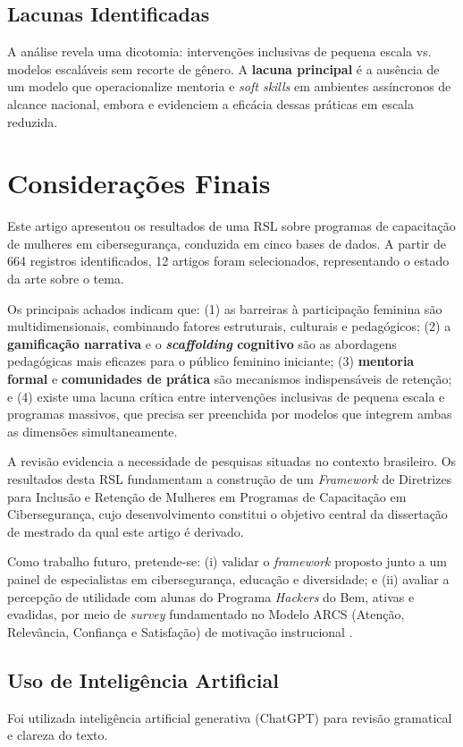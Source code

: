 \documentclass[12pt]{article}
\begin{document}
\subsection{Lacunas Identificadas}

A análise revela uma dicotomia: intervenções inclusivas de pequena escala vs. modelos escaláveis sem recorte de gênero. A \textbf{lacuna principal} é a ausência de um modelo que operacionalize mentoria e \textit{soft skills} em ambientes assíncronos de alcance nacional, embora \cite{Musuva2025} e \cite{Benson2025} evidenciem a eficácia dessas práticas em escala reduzida.


\section{Considerações Finais} \label{sec:conclusao}

Este artigo apresentou os resultados de uma RSL sobre programas de capacitação de
mulheres em cibersegurança, conduzida em cinco bases de dados. A partir de 664 registros identificados, 12 artigos foram selecionados, representando o estado da arte sobre o tema.

Os principais achados indicam que: (1) as barreiras à participação feminina são
multidimensionais, combinando fatores estruturais, culturais e pedagógicos; (2) a
\textbf{gamificação narrativa} e o \textbf{\textit{scaffolding} cognitivo} são as
abordagens pedagógicas mais eficazes para o público feminino iniciante; (3)
\textbf{mentoria formal} e \textbf{comunidades de prática} são mecanismos indispensáveis
de retenção; e (4) existe uma lacuna crítica entre intervenções inclusivas de pequena
escala e programas massivos, que precisa ser preenchida por modelos que integrem ambas
as dimensões simultaneamente.

A revisão evidencia a necessidade de pesquisas situadas no contexto brasileiro. Os resultados desta RSL fundamentam a construção de um \textit{Framework} de Diretrizes para Inclusão e Retenção de Mulheres em Programas de Capacitação em Cibersegurança, cujo desenvolvimento constitui o objetivo central da dissertação de mestrado da qual este artigo é derivado.

Como trabalho futuro, pretende-se: (i) validar o \textit{framework} proposto junto a um
painel de especialistas em cibersegurança, educação e diversidade; e (ii) avaliar a
percepção de utilidade com alunas do Programa \textit{Hackers} do Bem, ativas e evadidas,
por meio de \textit{survey} fundamentado no Modelo ARCS (Atenção, Relevância, Confiança e Satisfação) de motivação instrucional \cite{Keller1987}.

\subsection*{Uso de Inteligência Artificial}

Foi utilizada inteligência artificial generativa (ChatGPT) para revisão gramatical e clareza do texto.



\end{document}
